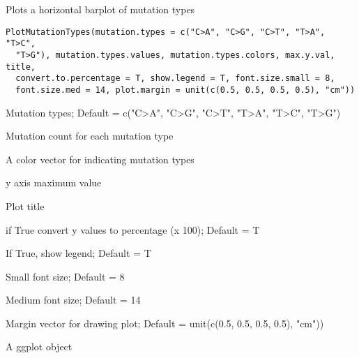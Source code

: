 \documentclass[letterpaper]{book}
\begin{document}
%
\begin{Description}\relax
Plots a horizontal barplot of mutation types
\end{Description}
%
\begin{Usage}
\begin{verbatim}
PlotMutationTypes(mutation.types = c("C>A", "C>G", "C>T", "T>A", "T>C",
  "T>G"), mutation.types.values, mutation.types.colors, max.y.val, title,
  convert.to.percentage = T, show.legend = T, font.size.small = 8,
  font.size.med = 14, plot.margin = unit(c(0.5, 0.5, 0.5, 0.5), "cm"))
\end{verbatim}
\end{Usage}
%
\begin{Arguments}
\begin{ldescription}
\item[\code{mutation.types}] Mutation types; Default = c("C>A", "C>G", "C>T", "T>A", "T>C", "T>G")

\item[\code{mutation.types.values}] Mutation count for each mutation type

\item[\code{mutation.types.colors}] A color vector for indicating mutation types

\item[\code{max.y.val}] y axis maximum value

\item[\code{title}] Plot title

\item[\code{convert.to.percentage}] if True convert y values to percentage (x 100); Default = T

\item[\code{show.legend}] If True, show legend; Default = T

\item[\code{font.size.small}] Small font size; Default = 8

\item[\code{font.size.med}] Medium font size; Default = 14

\item[\code{plot.margin}] Margin vector for drawing plot; Default = unit(c(0.5, 0.5, 0.5, 0.5), "cm"))
\end{ldescription}
\end{Arguments}
%
\begin{Value}
A ggplot object
\end{Value}
%
\end{document}
